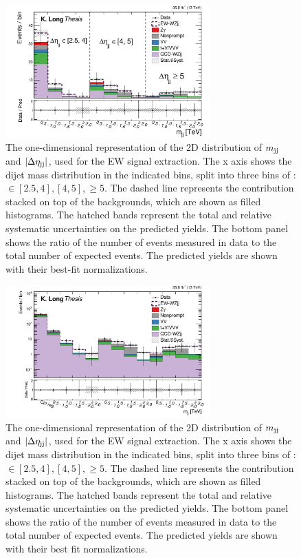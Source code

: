 \begin{figure}[htbp]
  \centering
   \includegraphics[width=0.7\textwidth]{figures/AnalysisProcedure/mjj_etajj_unrolled_Expected.pdf}\qquad
  \caption{
    The one-dimensional representation of the 2D distribution of 
    $m_{\mathrm{jj}}$ and $\left|\Delta\eta_{\mathrm{jj}}\right|$, used for the EW 
    signal extraction. The x axis shows the dijet mass distribution
    in the indicated bins, split into three bins of {\etajj }: {\etajj} $\in [2.5, 4], [4, 5], \ge 5$.
    The dashed line represents the \EWWZ contribution stacked
    on top of the backgrounds, which are shown as filled histograms. 
    The hatched bands represent the total and relative 
    systematic uncertainties on the predicted yields.
    The bottom panel shows the ratio of the number of events measured in data to the total 
    number of expected events. 
    The predicted yields are shown with their best-fit normalizations.
}
\label{fig:2DfitDistribution}
\end{figure}

\begin{figure}[htbp]
  \centering
   \includegraphics[width=0.7\textwidth]{figures/AnalysisProcedure/mjj_etajj_unrolled_wCR_Expected.pdf}\qquad
  \caption{
    The one-dimensional representation of the 2D distribution of 
    $m_{\mathrm{jj}}$ and $\left|\Delta\eta_{\mathrm{jj}}\right|$, used for the EW 
    signal extraction. The x axis shows the dijet mass distribution
    in the indicated bins, split into three bins of {\etajj }: {\etajj} $\in [2.5, 4], [4, 5], \ge 5$.
    The dashed line represents the \EWWZ contribution stacked
    on top of the backgrounds, which are shown as filled histograms. 
    The hatched bands represent the total and relative 
    systematic uncertainties on the predicted yields.
    The bottom panel shows the ratio of the number of events measured in data to the total 
    number of expected events. 
    The predicted yields are shown with their best fit normalizations.
}
\label{fig:2DfitDistributionWCR}
\end{figure}

